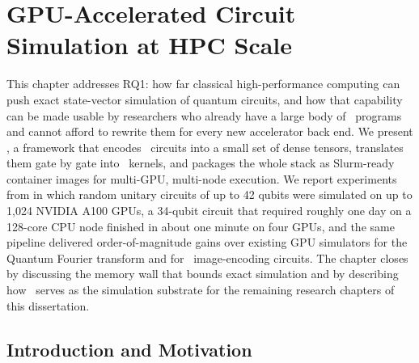 \chapter{GPU-Accelerated Circuit Simulation at HPC Scale}\label{ch:qgear}



This chapter addresses RQ1: how far classical high-performance computing can push exact state-vector simulation of quantum circuits, and how that capability can be made usable by researchers who already have a large body of \qiskit\ programs and cannot afford to rewrite them for every new accelerator back end. We present \qgear, a framework that encodes \qiskit\ circuits into a small set of dense tensors, translates them gate by gate into \cudaq\ kernels, and packages the whole stack as Slurm-ready container images for multi-GPU, multi-node execution. We report experiments from \cite{guo2025qgear} in which random unitary circuits of up to 42 qubits were simulated on up to 1,024 NVIDIA A100 GPUs, a 34-qubit circuit that required roughly one day on a 128-core CPU node finished in about one minute on four GPUs, and the same pipeline delivered order-of-magnitude gains over existing GPU simulators for the Quantum Fourier transform and for \qcrank\ image-encoding circuits. The chapter closes by discussing the memory wall that bounds exact simulation and by describing how \qgear\ serves as the simulation substrate for the remaining research chapters of this dissertation.

\section{Introduction and Motivation}\label{sec:qgear:intro}

